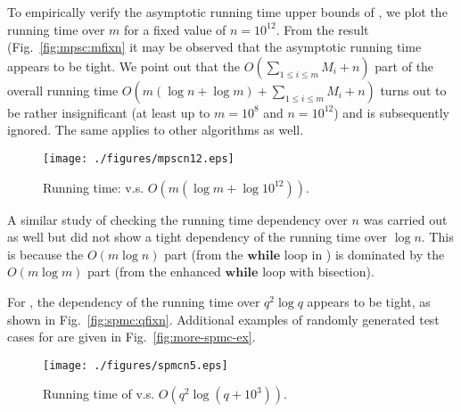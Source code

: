To empirically verify the asymptotic running time upper bounds of 
\algoMRSimple, we plot the running time over $m$ for a fixed value of 
$n =10^{12}$. From the result (Fig.~\ref{fig:mpsc:mfixn} it may be 
observed that the asymptotic running time appears to be tight. We point
out that the $O(\sum_{1\le i \le m} M_i + n)$ part of the overall 
running time $O(m(\log n + \log m) + \sum_{1\le i \le m} M_i + n)$ turns 
out to be rather insignificant (at least up to $m = 10^8$ and $n = 10^12$) 
and is subsequently ignored. The same applies to other algorithms as 
well. 
\begin{figure}[ht!]
    \vspace*{-2mm}
    \centering
    \texttt{[image: ./figures/mpscn12.eps]}
    \vspace*{-4mm}
    \caption{\label{fig:opg-mpsc:mfixn}Running time: \algoMRSimple 
		v.s. $O(m (\log m + \log 10^{12}))$.}
    \vspace*{-3mm}
\end{figure}

A similar study of checking the running time dependency over $n$ was 
carried out as well but did not show a tight dependency of the running 
time over $\log n$. This is because the $O(m\log n)$ part (from the 
$\mathbf{while}$ loop in \algoMRSimple) is dominated by the 
$O(m\log m)$ part (from the enhanced $\mathbf{while}$ loop with bisection). 

For \algoSRG, the dependency of the running time over $q^2\log q$ 
appears to be tight, as shown in Fig.~\ref{fig:spmc:qfixn}. Additional 
examples of randomly generated test cases for \algoSRG are 
given in Fig.~\ref{fig:more-spmc-ex}. 
\begin{figure}[ht!]
    \centering
    \texttt{[image: ./figures/spmcn5.eps]}
    \vspace*{-4mm}
    \caption{\label{fig:opg-spmc:qfixn}Running time of \algoSRG 
		v.s. $O(q^2\log(q + 10^3))$.}
    \vspace*{-2mm}
\end{figure}

